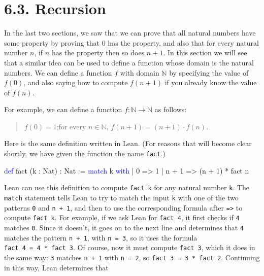 \documentclass[
  letterpaper,
  DIV=11,
  numbers=noendperiod]{scrreprt}
\newenvironment{Shaded}{\begin{snugshade}}{\end{snugshade}}
\newcommand{\KeywordTok}[1]{\textcolor[rgb]{0.00,0.23,0.31}{#1}}
\newcommand{\NormalTok}[1]{\textcolor[rgb]{0.00,0.23,0.31}{#1}}
\renewcommand{\NormalTok}[1]{\textcolor[HTML]{000000}{#1}}
\renewcommand{\KeywordTok}[1]{\textcolor[HTML]{0000FF}{#1}}
\theoremstyle{remark}
\begin{document}
\hypertarget{recursion}{%
\section{6.3. Recursion}\label{recursion}}

In the last two sections, we saw that we can prove that all natural
numbers have some property by proving that 0 has the property, and also
that for every natural number \(n\), if \(n\) has the property then so
does \(n + 1\). In this section we will see that a similar idea can be
used to define a function whose domain is the natural numbers. We can
define a function \(f\) with domain \(\mathbb{N}\) by specifying the
value of \(f(0)\), and also saying how to compute \(f(n+1)\) if you
already know the value of \(f(n)\).

For example, we can define a function \(f : \mathbb{N} \to \mathbb{N}\)
as follows:

\begin{quote}
\(f(0) = 1\);\newline for every \(n \in \mathbb{N}\),
\(f(n+1) = (n+1) \cdot f(n)\).

\end{quote}

Here is the same definition written in Lean. (For reasons that will
become clear shortly, we have given the function the name
\texttt{fact}.)

\begin{Shaded}
\begin{Highlighting}[]
\KeywordTok{def}\NormalTok{ fact (k : Nat) : Nat :=}
  \KeywordTok{match}\NormalTok{ k }\KeywordTok{with}
\NormalTok{    | 0 =\textgreater{} 1}
\NormalTok{    | n + 1 =\textgreater{} (n + 1) * fact n}
\end{Highlighting}
\end{Shaded}

Lean can use this definition to compute \texttt{fact\ k} for any natural
number \texttt{k}. The \texttt{match} statement tells Lean to try to
match the input \texttt{k} with one of the two patterns \texttt{0} and
\texttt{n\ +\ 1}, and then to use the corresponding formula after
\texttt{=\textgreater{}} to compute \texttt{fact\ k}. For example, if we
ask Lean for \texttt{fact\ 4}, it first checks if \texttt{4} matches
\texttt{0}. Since it doesn't, it goes on to the next line and determines
that \texttt{4} matches the pattern \texttt{n\ +\ 1}, with
\texttt{n\ =\ 3}, so it uses the formula
\texttt{fact\ 4\ =\ 4\ *\ fact\ 3}. Of course, now it must compute
\texttt{fact\ 3}, which it does in the same way: \texttt{3} matches
\texttt{n\ +\ 1} with \texttt{n\ =\ 2}, so
\texttt{fact\ 3\ =\ 3\ *\ fact\ 2}. Continuing in this way, Lean
determines that
\end{document}
